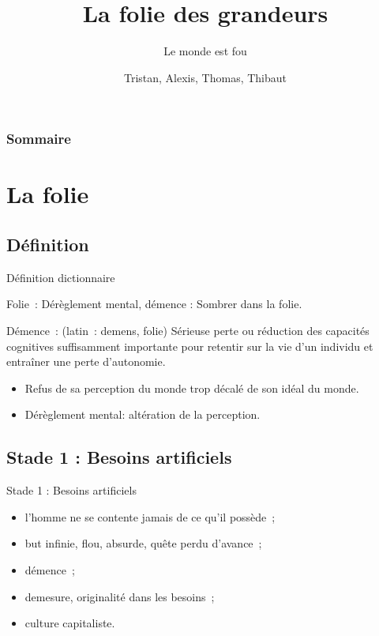 \documentclass{beamer}
\title{La folie des grandeurs}
\subtitle{Le monde est fou}
\author{Tristan, Alexis, Thomas, Thibaut}
\begin{document}
\begin{frame}
  \titlepage
\end{frame}

\begin{frame}
    \frametitle{Sommaire}
    \begin{multicols}{2}
      {
		\setcounter{tocdepth}{1}
        \tableofcontents
      }
    \end{multicols}
\end{frame}

\section{La folie}

\subsection{Définition}
\begin{frame}{Définition dictionnaire}
  \begin{displayquote}
    Folie~: Dérèglement mental, démence : Sombrer dans la folie.
    
    Démence~: (latin~: demens, folie) Sérieuse perte ou réduction des capacités cognitives suffisamment importante pour retentir sur la vie d'un individu et entraîner une perte d'autonomie.
  \end{displayquote}
\end{frame}

\begin{frame}
  \begin{itemize}
    \item Refus de sa perception du monde trop décalé de son idéal du monde.
    \item Dérèglement mental: altération de la perception.
  \end{itemize}
\end{frame}

\subsection{Stade 1 : Besoins artificiels}
\begin{frame}{Stade 1 : Besoins artificiels}
  \begin{itemize}
    \item l'homme ne se contente jamais de ce qu'il possède~;
    \item but infinie, flou, absurde, quête perdu d'avance~;
    \item démence~;
    \item demesure, originalité dans les besoins~;
    \item culture capitaliste.
  \end{itemize}
\end{frame}
\end{document}
